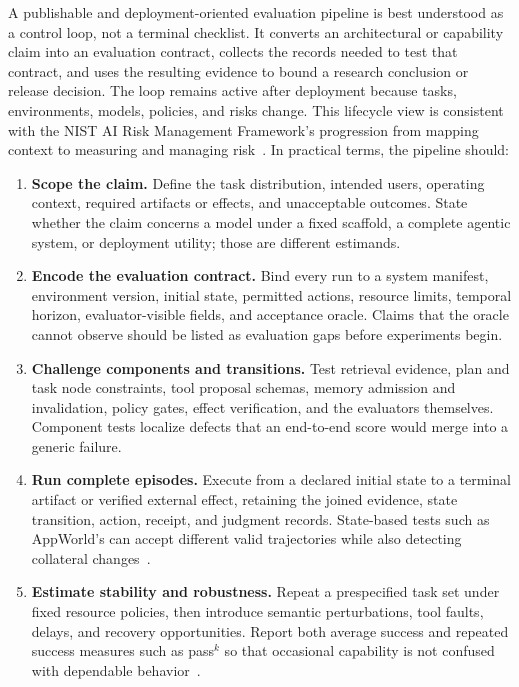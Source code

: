 A publishable and deployment-oriented evaluation pipeline is best understood as a control loop, not a terminal checklist. It converts an architectural or capability claim into an evaluation contract, collects the records needed to test that contract, and uses the resulting evidence to bound a research conclusion or release decision. The loop remains active after deployment because tasks, environments, models, policies, and risks change. This lifecycle view is consistent with the NIST AI Risk Management Framework's progression from mapping context to measuring and managing risk~\cite{nist2023airmf,nist2024genaiprofile}. In practical terms, the pipeline should:
\begin{enumerate}
    \item \textbf{Scope the claim.} Define the task distribution, intended users, operating context, required artifacts or effects, and unacceptable outcomes. State whether the claim concerns a model under a fixed scaffold, a complete agentic system, or deployment utility; those are different estimands.
    \item \textbf{Encode the evaluation contract.} Bind every run to a system manifest, environment version, initial state, permitted actions, resource limits, temporal horizon, evaluator-visible fields, and acceptance oracle. Claims that the oracle cannot observe should be listed as evaluation gaps before experiments begin.
    \item \textbf{Challenge components and transitions.} Test retrieval evidence, plan and task node constraints, tool proposal schemas, memory admission and invalidation, policy gates, effect verification, and the evaluators themselves. Component tests localize defects that an end-to-end score would merge into a generic failure.
    \item \textbf{Run complete episodes.} Execute from a declared initial state to a terminal artifact or verified external effect, retaining the joined evidence, state transition, action, receipt, and judgment records. State-based tests such as AppWorld's can accept different valid trajectories while also detecting collateral changes~\cite{trivedi2024appworld}.
    \item \textbf{Estimate stability and robustness.} Repeat a prespecified task set under fixed resource policies, then introduce semantic perturbations, tool faults, delays, and recovery opportunities. Report both average success and repeated success measures such as pass$^k$ so that occasional capability is not confused with dependable behavior~\cite{yao2024taubench}.

\end{enumerate}
